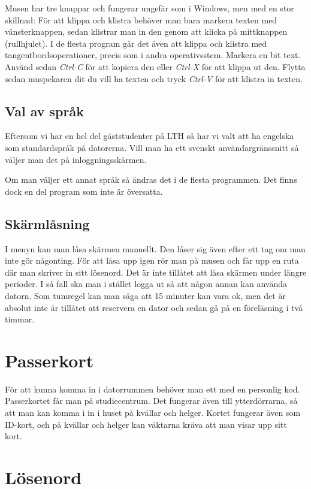 \documentclass[a4paper,twocolumn]{book}
\begin{document}
Musen har tre knappar och fungerar ungefär som i Windows, men med en stor
skillnad: För att klippa och klistra behöver man bara markera texten med
vänsterknappen, sedan klistrar man in den genom att klicka på mittknappen
(rullhjulet). I de flesta program går det även att klippa och klistra med
tangentbordsoperationer, precis som i andra operativsstem.
Markera en bit text. Använd sedan \emph{Ctrl-C} för
att kopiera den eller \emph{Ctrl-X} för att klippa ut den. Flytta sedan
muspekaren dit du vill ha texten och tryck \emph{Ctrl-V} för att klistra in
texten.
\subsection{Val av språk}
Eftersom vi har en hel del gäststudenter på LTH så har vi valt att ha engelska
som standardspråk på datorerna. Vill man ha ett svenskt användargränssnitt så
väljer man det på inloggningsskärmen.

Om man väljer ett annat språk så ändras det i de flesta programmen. Det finns
dock en del program som inte är översatta.

\subsection{Skärmlåsning}

I menyn kan man låsa skärmen manuellt. Den låser sig även efter
ett tag om man inte gör någonting. För att låsa upp igen rör man på musen och
får upp en ruta där man skriver in sitt lösenord. Det är inte tillåtet att
låsa skärmen under längre perioder. I så fall ska man i stället logga ut så
att någon annan kan använda datorn. Som tumregel kan man säga att 15
minuter kan vara ok, men det är absolut inte är tillåtet att reservera en
dator och sedan gå på en föreläsning i två timmar.

\section{Passerkort}

För att kunna komma in i datorrummen behöver man ett
 med en personlig kod. Passerkortet får man på studiecentrum.
Det fungerar även till ytterdörrarna, så att man kan komma i in i huset på
kvällar och helger. Kortet fungerar även som ID-kort, och på kvällar och
helger kan väktarna kräva att man visar upp sitt kort. 

\section{Lösenord}
\end{document}
